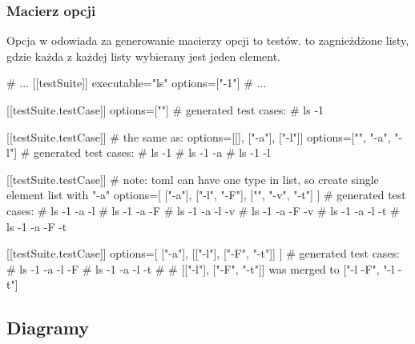 \documentclass[a4paper,12pt]{article}
\newenvironment{longlisting}{\captionsetup{type=listing}}{}
\begin{document}
\subsubsection{Macierz opcji} \label{optionsMartix}

Opcja  w  odowiada za generowanie macierzy opcji to testów.  to zagnieżdżone listy, gdzie każda z każdej listy wybierany jest jeden element.

\begin{longlisting}
\begin{tomlcode}
# ...
[[testSuite]]
executable="ls"
options=["-1"]
# ...

[[testSuite.testCase]]
options=[""]
# generated test cases:
# ls -1

[[testSuite.testCase]]
# the same as: options=[[], ["-a"], ["-l"]]
options=["", "-a", "-l"]
# generated test cases:
# ls -1
# ls -1 -a
# ls -1 -l

[[testSuite.testCase]]
# note: toml can have one type in list, so create single element list with "-a"
options=[
  ["-a"],
  ["-l", "-F"],
  ["", "-v", "-t"]
]
# generated test cases:
# ls -1 -a -l
# ls -1 -a -F
# ls -1 -a -l -v
# ls -1 -a -F -v
# ls -1 -a -l -t
# ls -1 -a -F -t

[[testSuite.testCase]]
options=[
  ["-a"],
  [["-l"], ["-F", "-t"]]
]
# generated test cases:
# ls -1 -a -l -F
# ls -1 -a -l -t
#
# [["-l"], ["-F", "-t"]] was merged to ["-l -F", "-l -t"]
\end{tomlcode}
\end{longlisting}

\subsection{Diagramy}
\end{document}
